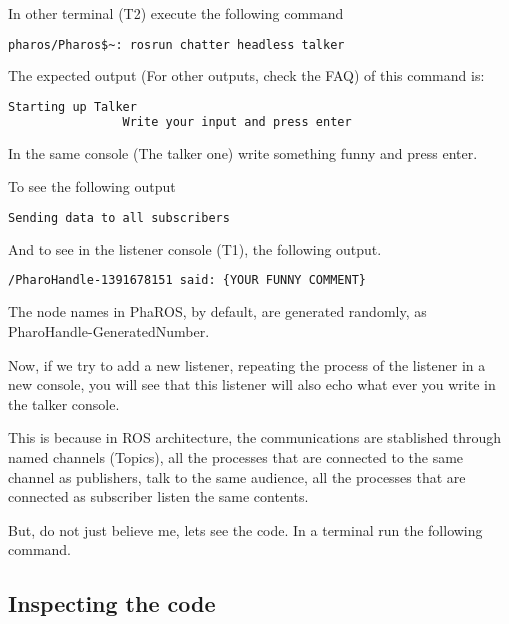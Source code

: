 \documentclass[a4paper,10pt,twoside]{book}
\begin{document}
			
			In other terminal (T2) execute the following command 
			
			\begin{lstlisting}[language=bash,title={Starting up talker}]
				pharos/Pharos$~: rosrun chatter headless talker
			\end{lstlisting}
			
			The expected output (For other outputs, check the FAQ) of this command is: 
			
			\begin{lstlisting}[language=bash,title={Talker output}]
				Starting up Talker
				Write your input and press enter
			\end{lstlisting}
			
			
			In the same console (The talker one) write something funny and press enter. 
			
			To see the following output 
			
			\begin{lstlisting}[language=bash,title={Talker output 2}]
				Sending data to all subscribers
			\end{lstlisting}
			
			And to see in the listener console (T1), the following output. 
			
			\begin{lstlisting}[language=bash,title={Listener output 2}]
				/PharoHandle-1391678151 said: {YOUR FUNNY COMMENT}
			\end{lstlisting}
			
			The node names in PhaROS, by default, are generated randomly, as PharoHandle-{GeneratedNumber}.

			
			
			Now, if we try to add a new listener, repeating the process of the listener in a new console, you will see  that this listener will also echo what ever you write in the talker console. 
			
			This is because in ROS architecture, the communications are stablished through named channels (Topics), all the processes that are connected to the same channel as publishers, talk to the same audience, all the processes that are connected as subscriber listen the same contents. 
			
			
			But, do not just believe me, lets see the code. In a terminal run the following command. 
			
			
			\subsection{Inspecting the code} \label{sssection:chatterinspect}
			
\end{document}
